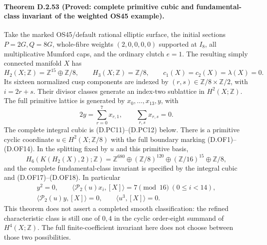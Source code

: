 \paragraph{Theorem D.2.53 (Proved: complete primitive cubic and fundamental-class invariant of the weighted OS45 example).}
Take the marked OS45/default rational elliptic surface, the initial
sections \(P=2G,Q=8G\), whole-fibre weights
\((2,0,0,0,0)\) supported at \(I_8\), all multiplicative Mumford
caps, and the ordinary clutch \(e=1\). The resulting simply
connected manifold \(X\) has
\[
 H_2(X;\mathbb Z)=\mathbb Z^{15}\oplus\mathbb Z/8,\qquad
 H_3(X;\mathbb Z)=\mathbb Z/8,\qquad
 c_1(X)=c_2(X)=\lambda(X)=0.                              \tag{D.OS1}
\]
Its sixteen normalized cusp components are indexed by
\((r,s)\in\mathbb Z/8\times\mathbb Z/2\), with \(i=2r+s\).
Their divisor classes generate an index-two sublattice in
\(H^2(X;\mathbb Z)\). The full primitive lattice is generated
by \(x_0,\ldots,x_{13},y\), with
\[
             2y=\sum_{r=0}^7x_{r,1},\qquad
             \sum_{r,s}x_{r,s}=0.                        \tag{D.OS2}
\]
The complete integral cubic is (D.PC11)--(D.PC12) below.
There is a primitive cyclic coordinate \(u\in H^2(X;\mathbb Z/8)\)
with the full boundary marking (D.OF1)--(D.OF14). In the splitting
fixed by \(u\) and this primitive basis,
\[
 H_6(K(H_2(X),2);\mathbb Z)
   =\mathbb Z^{680}\oplus(\mathbb Z/8)^{120}
                       \oplus(\mathbb Z/16)^{15}
                       \oplus\mathbb Z/8,                \tag{D.OS3}
\]
and the complete fundamental-class invariant is specified by
the integral cubic and (D.OF17)--(D.OF18).
In particular
\[
 \begin{gathered}
 y^2=0,\qquad
 \langle\mathcal P_2(u)x_i,[X]\rangle=7\pmod{16}
                   \ (0\le i<14),\\
 \langle\mathcal P_2(u)y,[X]\rangle=0,\qquad
 \langle u^3,[X]\rangle=0.
 \end{gathered}                                           \tag{D.OS4}
\]
This theorem does not assert a completed smooth classification:
the refined characteristic class is still one of \(0,4\)
in the cyclic order-eight summand of \(H^4(X;\mathbb Z)\).
The full finite-coefficient invariant here does not choose
between those two possibilities.



